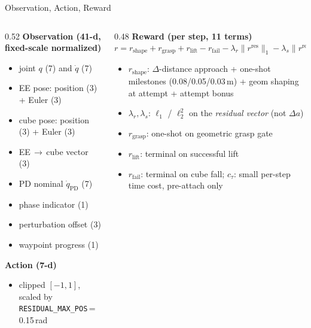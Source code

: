 \documentclass[aspectratio=169, 10pt]{beamer}
\begin{document}
\begin{frame}{Observation, Action, Reward}
  \small
  \begin{columns}[T]
    \begin{column}{0.52\textwidth}
      \textbf{Observation (41-d, fixed-scale normalized)}
      \begin{itemize}\setlength\itemsep{0.1em}
        \item joint $q$ (7) and $\dot q$ (7)
        \item EE pose: position (3) + Euler (3)
        \item cube pose: position (3) + Euler (3)
        \item EE\,$\to$\,cube vector (3)
        \item PD nominal $\dot q_{\text{PD}}$ (7)
        \item phase indicator (1)
        \item perturbation offset (3)
        \item waypoint progress (1)
      \end{itemize}

      \textbf{Action (7-d)}
      \begin{itemize}\setlength\itemsep{0.1em}
        \item clipped $[-1, 1]$, scaled by \texttt{RESIDUAL\_MAX\_POS}\,=\,0.15\,rad
      \end{itemize}
    \end{column}
    \begin{column}{0.48\textwidth}
      \textbf{Reward (per step, 11 terms)}
      \[
        r = r_{\text{shape}} + r_{\text{grasp}} + r_{\text{lift}}
            - r_{\text{fail}} - \lambda_r\lVert r^{\text{res}}\rVert_1
            - \lambda_s\lVert r^{\text{res}}\rVert_2^2 - c_\tau
      \]
      \begin{itemize}\setlength\itemsep{0.1em}
        \item $r_{\text{shape}}$: $\Delta$-distance approach +
              one-shot milestones (0.08/0.05/0.03\,m) + geom shaping at
              attempt + attempt bonus
        \item $\lambda_r, \lambda_s$: $\ell_1$ / $\ell_2^2$ on the
              \emph{residual vector} (not $\Delta a$)
        \item $r_{\text{grasp}}$: one-shot on geometric grasp gate
        \item $r_{\text{lift}}$: terminal on successful lift
        \item $r_{\text{fail}}$: terminal on cube fall; $c_\tau$: small
              per-step time cost, pre-attach only
      \end{itemize}
    \end{column}
  \end{columns}
\end{frame}
\end{document}
